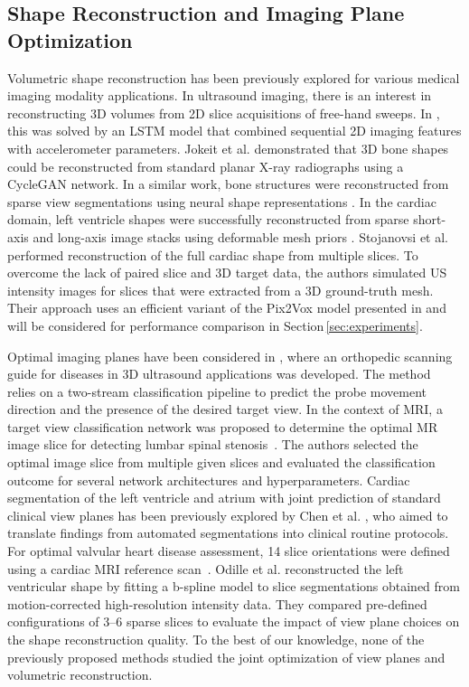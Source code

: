     \subsection{Shape Reconstruction and Imaging Plane Optimization}
    \label{sec:shape_recon_plane_optimization}
     Volumetric shape reconstruction has been previously explored for various medical imaging modality applications.
    In ultrasound imaging, there is an interest in reconstructing 3D volumes from 2D slice acquisitions of free-hand sweeps. In \citep{luo2022deep}, this was solved by an LSTM model that combined sequential 2D imaging features with accelerometer parameters.
    Jokeit et al. \citep{jokeit2022mesh} demonstrated that 3D bone shapes could be reconstructed from standard planar X-ray radiographs using a CycleGAN network.
    In a similar work, bone structures were reconstructed from sparse view segmentations using neural shape representations \citep{amiranashvili2022learning}.
    In the cardiac domain, left ventricle shapes were successfully reconstructed from sparse short-axis and long-axis image stacks using deformable mesh priors \citep{beetz2022reconstructing}.
    Stojanovsi et al. \citep{stojanovski2022efficient} performed reconstruction of the full cardiac shape from multiple slices.
    To overcome the lack of paired slice and 3D target data, the authors simulated US intensity images for slices that were extracted from a 3D ground-truth mesh. Their approach uses an efficient variant of the Pix2Vox
    model presented in \citep{xie2019pix2vox} and will be considered for performance comparison in Section\,\ref{sec:experiments}.

    Optimal imaging planes have been considered in \citep{lee2022usg}, where
    an orthopedic scanning guide for diseases in 3D ultrasound applications was developed. The method relies on a two-stream classification pipeline to predict the probe movement direction and the presence of the desired target view.
    In the context of MRI, a target view classification network was proposed to determine the optimal MR image slice for detecting lumbar spinal stenosis~\citep{natalia2022automated}.
    The authors selected the optimal image slice from multiple given slices and evaluated the classification outcome for several network architectures and hyperparameters.
    Cardiac segmentation of the left ventricle and atrium with joint prediction of standard clinical view planes has been previously explored by Chen et al. \citep{chen2021automated}, who aimed to translate findings from automated segmentations into clinical routine protocols.
    For optimal valvular heart disease assessment, 14 slice orientations were defined using a cardiac MRI reference scan~\citep{nitta2014automatic}.
    Odille et al. \citep{odille2018isotropic} reconstructed the left ventricular shape by fitting a b-spline model to slice segmentations obtained from motion-corrected high-resolution intensity data. They compared pre-defined configurations of 3--6 sparse slices to evaluate the impact of view plane choices on the shape reconstruction quality.
    To the best of our knowledge, none of the previously proposed methods studied the joint optimization of view planes and volumetric reconstruction.

